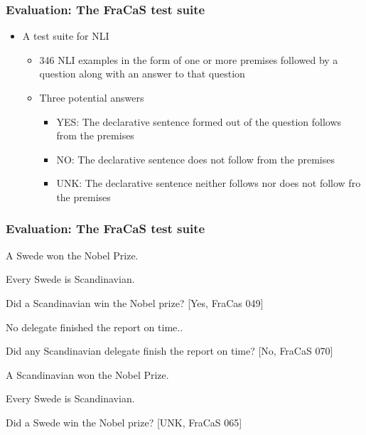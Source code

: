 \documentclass[11pt]{beamer}
\begin{document}
\begin{frame}
  \frametitle{Evaluation: The FraCaS test suite}
  \begin{itemize}
  \item A test suite for NLI
    \begin{itemize}
    \item 346 NLI examples in the form of one or more premises
      followed by a question along with an answer to that question
    \item Three potential answers
      \begin{itemize}
      \item YES: The declarative sentence formed out of the question follows from the premises
      \item NO: The declarative sentence does not follow from the premises
      \item UNK: The declarative sentence neither follows nor does not follow fro the premises
      \end{itemize}\end{itemize}\end{itemize}
\end{frame}


\begin{frame}
  \frametitle{Evaluation: The FraCaS test suite}
  
  \begin{exe}
    \ex
    A Swede won the Nobel Prize.
    
    Every Swede is  Scandinavian.
    
    Did a Scandinavian win the Nobel prize? [Yes, FraCas 049]
  \end{exe}
  
  
  
  \begin{exe}
    \ex
    No delegate finished the report on time..
    
    Did any Scandinavian delegate finish the report on time? [No, FraCaS 070]
  \end{exe}
  
  
  \begin{exe}
    \ex
    A Scandinavian won the Nobel Prize.
    
    Every Swede is  Scandinavian.
    
    Did a Swede win the Nobel prize? [UNK, FraCaS 065]\end{exe}



\end{frame}
\end{document}
